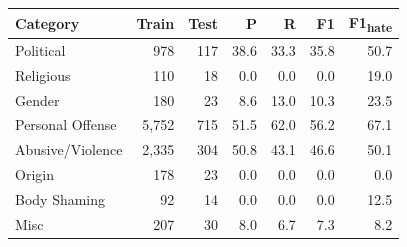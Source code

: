\begin{tabular}{lrrrrrr}
\toprule
Category & Train & Test & P & R & F1 & F1\textsubscript{hate} \\
\midrule
Political & 978 & 117 & 38.6 & 33.3 & 35.8 & 50.7 \\
Religious & 110 & 18 & 0.0 & 0.0 & 0.0 & 19.0 \\
Gender & 180 & 23 & 8.6 & 13.0 & 10.3 & 23.5 \\
Personal Offense & 5{,}752 & 715 & 51.5 & 62.0 & 56.2 & 67.1 \\
Abusive/Violence & 2{,}335 & 304 & 50.8 & 43.1 & 46.6 & 50.1 \\
Origin & 178 & 23 & 0.0 & 0.0 & 0.0 & 0.0 \\
Body Shaming & 92 & 14 & 0.0 & 0.0 & 0.0 & 12.5 \\
Misc & 207 & 30 & 8.0 & 6.7 & 7.3 & 8.2 \\
\bottomrule
\end{tabular}

